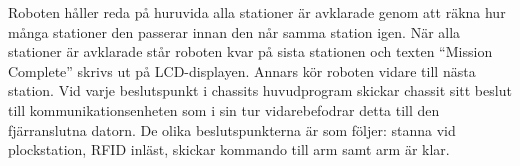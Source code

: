 Roboten håller reda på huruvida alla stationer är avklarade genom att räkna hur många stationer den passerar innan den når samma station igen. När alla stationer är avklarade står roboten kvar på sista stationen och texten “Mission Complete” skrivs ut på LCD-displayen. Annars kör roboten vidare till nästa station. Vid varje beslutspunkt i chassits huvudprogram skickar chassit sitt beslut till kommunikationsenheten som i sin tur vidarebefodrar detta till den fjärranslutna datorn. De olika beslutspunkterna är som följer: stanna vid plockstation, RFID inläst, skickar kommando till arm samt arm är klar. 
